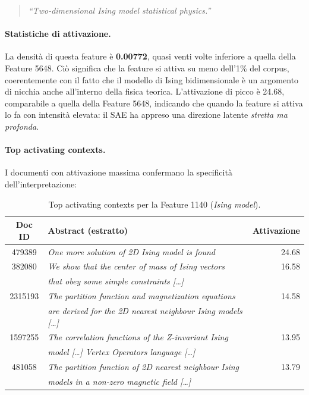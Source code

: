 \begin{quote}
\textit{``Two-dimensional Ising model statistical physics.''}
\end{quote}

\paragraph{Statistiche di attivazione.}
La densità di questa feature è \textbf{0.00772}, quasi venti volte inferiore a quella della Feature 5648. Ciò significa che la feature si attiva su meno dell'1\% del corpus, coerentemente con il fatto che il modello di Ising bidimensionale è un argomento di nicchia anche all'interno della fisica teorica. L'attivazione di picco è 24.68, comparabile a quella della Feature 5648, indicando che quando la feature si attiva lo fa con intensità elevata: il SAE ha appreso una direzione latente \textit{stretta ma profonda}.

\paragraph{Top activating contexts.}
I documenti con attivazione massima confermano la specificità dell'interpretazione:

\begin{table}[htbp]
    \centering
    \caption{Top activating contexts per la Feature 1140 (\textit{Ising model}).}
    \label{tab:feature_1140_top}
    \begin{tabular}{@{}clr@{}}
        \toprule
        \textbf{Doc ID} & \textbf{Abstract (estratto)} & \textbf{Attivazione} \\
        \midrule
        479389  & \textit{One more solution of 2D Ising model is found} & 24.68 \\
        382080  & \textit{We show that the center of mass of Ising vectors} & 16.58 \\
                & \textit{that obey some simple constraints [\ldots]} & \\
        2315193 & \textit{The partition function and magnetization equations} & 14.58 \\
                & \textit{are derived for the 2D nearest neighbour Ising models [\ldots]} & \\
        1597255 & \textit{The correlation functions of the Z-invariant Ising} & 13.95 \\
                & \textit{model [\ldots] Vertex Operators language [\ldots]} & \\
        481058  & \textit{The partition function of 2D nearest neighbour Ising} & 13.79 \\
                & \textit{models in a non-zero magnetic field [\ldots]} & \\
        \bottomrule
    \end{tabular}
\end{table}

